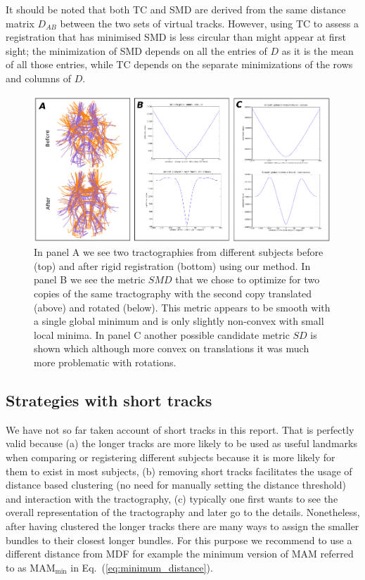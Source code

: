 \documentclass[preprint,authoryear,a4paper,10pt,onecolumn]{elsarticle}
\begin{document}
It should be noted that both TC and SMD are derived from the same
distance matrix $D_{AB}$ between the two sets of virtual
tracks. However, using TC to assess a registration that has minimised
SMD is less circular than might appear at first sight; the minimization
of SMD depends on all the entries of $D$ as it is the mean of all those
entries, while TC depends on the separate minimizations of the rows and
columns of $D$.

\begin{figure}
\begin{centering}
\includegraphics[scale=0.8]{Fig_9_QB_registration2}
\par\end{centering}
\caption{In panel A we see two tractographies from different subjects
  before (top) and after rigid registration (bottom) using our
  method. In panel B we see the metric $SMD$ that we chose to optimize
  for two copies of the same tractography with the second copy
  translated (above) and rotated (below). This metric appears to be
  smooth with a single global minimum and is only slightly non-convex
  with small local minima. In panel C another possible candidate metric
  $SD$ is shown which although more convex on translations it was much
  more problematic with rotations.\label{Flo:direct_registration}}
\end{figure}

\subsection{Strategies with short tracks}

We have not so far taken account of short tracks in this report. That
is perfectly valid because (a) the longer tracks are more likely to
be used as useful landmarks when comparing or registering different
subjects because it is more likely for them to exist in most subjects,
(b) removing short tracks facilitates the usage of distance based
clustering (no need for manually setting the distance threshold) and
interaction with the tractography, (c) typically one first wants to
see the overall representation of the tractography and later go to
the details. Nonetheless, after having clustered the longer tracks
there are many ways to assign the smaller bundles to their closest
longer bundles. For this purpose we recommend to use a different distance
from MDF for example the minimum version of MAM referred
to as $\textrm{MAM}_{\textrm{min}}$ in Eq.~(\ref{eq:minimum_distance}). 
\end{document}
